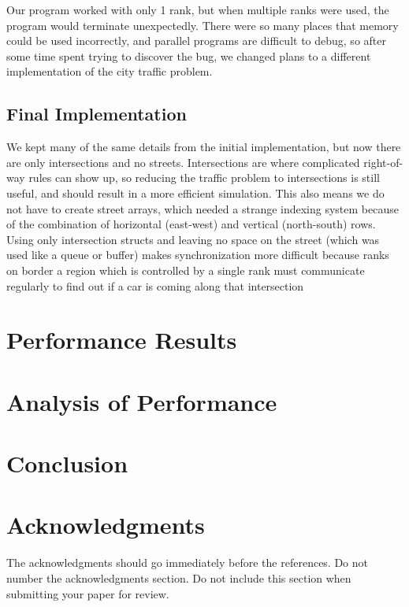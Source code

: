 \documentclass[11pt,a4paper]{article}
\begin{document}
Our program worked with only 1 rank, but when multiple ranks were used, the program would terminate unexpectedly. There were so many places that memory could be used incorrectly, and parallel programs are difficult to debug, so after some time spent trying to discover the bug, we changed plans to a different implementation of the city traffic problem.

\subsection{Final Implementation}

We kept many of the same details from the initial implementation, but now there are only intersections and no streets. Intersections are where complicated right-of-way rules can show up, so reducing the traffic problem to intersections is still useful, and should result in a more efficient simulation. This also means we do not have to create street arrays, which needed a strange indexing system because of the combination of horizontal (east-west) and vertical (north-south) rows.
Using only intersection structs and leaving no space on the street (which was used like a queue or buffer) makes synchronization more difficult because ranks on border a region which is controlled by a single rank must communicate regularly to find out if a car is coming along that intersection

\section{Performance Results}

\section{Analysis of Performance}

\section{Conclusion}

\section*{Acknowledgments}

The acknowledgments should go immediately before the references.  Do not number the acknowledgments section. Do not include this section when submitting your paper for review. \\



\end{document}
